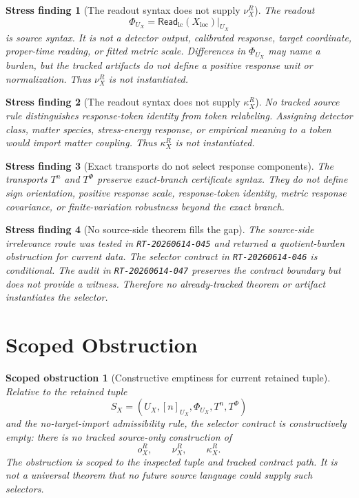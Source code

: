 \documentclass[11pt]{article}
\newcommand{\ReadLC}{\mathsf{Read}_{\mathrm{lc}}}
\newtheorem{stressfinding}{Stress finding}
\newtheorem{obstruction}{Scoped obstruction}
\begin{document}
\begin{stressfinding}[The readout syntax does not supply \(\nu^R_X\)]
The readout
\[
    \Phi_{U_X}=\ReadLC(X_{\mathrm{loc}})|_{U_X}
\]
is source syntax. It is not a detector output, calibrated response,
target coordinate, proper-time reading, or fitted metric scale.
Differences in \(\Phi_{U_X}\) may name a burden, but the tracked
artifacts do not define a positive response unit or normalization.
Thus \(\nu^R_X\) is not instantiated.
\end{stressfinding}

\begin{stressfinding}[The readout syntax does not supply \(\kappa^R_X\)]
No tracked source rule distinguishes response-token identity from
token relabeling. Assigning detector class, matter species,
stress-energy response, or empirical meaning to a token would import
matter coupling. Thus \(\kappa^R_X\) is not instantiated.
\end{stressfinding}

\begin{stressfinding}[Exact transports do not select response components]
The transports \(T^n\) and \(T^\Phi\) preserve exact-branch
certificate syntax. They do not define sign orientation, positive
response scale, response-token identity, metric response covariance,
or finite-variation robustness beyond the exact branch.
\end{stressfinding}

\begin{stressfinding}[No source-side theorem fills the gap]
The source-side irrelevance route was tested in \texttt{RT-20260614-045}
and returned a quotient-burden obstruction for current data. The
selector contract in \texttt{RT-20260614-046} is conditional. The
audit in \texttt{RT-20260614-047} preserves the contract boundary but
does not provide a witness. Therefore no already-tracked theorem or
artifact instantiates the selector.
\end{stressfinding}

\section{Scoped Obstruction}

\begin{obstruction}[Constructive emptiness for current retained tuple]
Relative to the retained tuple
\[
    S_X=(U_X,[n]_{U_X},\Phi_{U_X},T^n,T^\Phi)
\]
and the no-target-import admissibility rule, the selector contract is
constructively empty: there is no tracked source-only construction of
\[
    o^R_X,\qquad \nu^R_X,\qquad \kappa^R_X.
\]
The obstruction is scoped to the inspected tuple and tracked contract
path. It is not a universal theorem that no future source language
could supply such selectors.
\end{obstruction}
\end{document}
